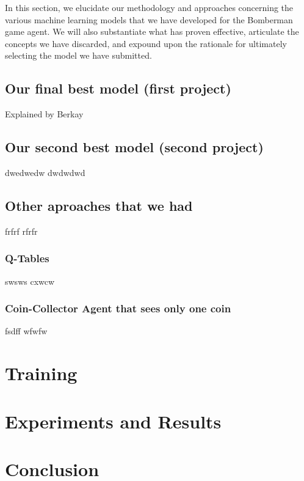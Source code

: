 \documentclass[a4paper,12pt,headsepline, fleqn, english]{scrartcl}%
\begin{document}
	In this section, we elucidate our methodology and approaches concerning the various machine learning models 
	that we have developed for the Bomberman game agent. We will also substantiate what has proven effective, articulate 
	the concepts we have discarded, and expound upon the rationale for ultimately selecting the model we have submitted.

	\subsection{Our final best model (first project)}
	
	Explained by Berkay

	\subsection{Our second best model (second project)}
	dwedwedw
	dwdwdwd

	\subsection{Other aproaches that we had}
	frfrf
	rfrfr

	\subsubsection{Q-Tables}
	swsws
	cxwcw
	
	\subsubsection{Coin-Collector Agent that sees only one coin}
	fsdff
	wfwfw
	
	\section{Training}
	
	\section{Experiments and Results}
	
	\section{Conclusion}
	
	\newpage	
	
	\printbibliography
\end{document}
